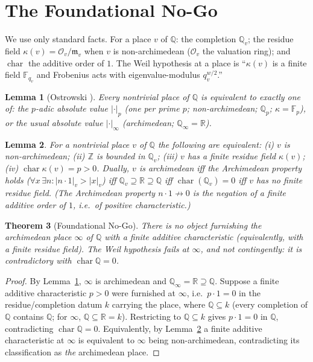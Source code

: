 \documentclass[11pt,reqno]{amsart}
\theoremstyle{plain}
\newtheorem{theorem}{Theorem}
\newtheorem{lemma}[theorem]{Lemma}
\theoremstyle{definition}
\theoremstyle{remark}
\newcommand{\Q}{\mathbb{Q}}
\newcommand{\R}{\mathbb{R}}
\newcommand{\Z}{\mathbb{Z}}
\newcommand{\F}{\mathbb{F}}
\newcommand{\m}{\mathfrak{m}}
\newcommand{\Oo}{\mathcal{O}}
\newcommand{\Char}{\operatorname{char}}
\begin{document}
\section{The Foundational No-Go}\label{sec:A}

We use only standard facts. For a place $v$ of $\Q$: the completion $\Q_v$; the residue field
$\kappa(v)=\Oo_v/\m_v$ when $v$ is non-archimedean ($\Oo_v$ the valuation ring); and $\Char$ the additive
order of $1$. The Weil hypothesis at a place is ``$\kappa(v)$ is a finite field $\F_{q_v}$ and Frobenius acts
with eigenvalue-modulus $q_v^{w/2}$.''

\begin{lemma}[Ostrowski {\cite{Ostrowski}}]\label{lem:ostrowski}
Every nontrivial place of $\Q$ is equivalent to exactly one of: the $p$-adic absolute value $|\cdot|_p$ (one
per prime $p$; non-archimedean; $\Q_p$; $\kappa=\F_p$), or the usual absolute value $|\cdot|_\infty$
(archimedean; $\Q_\infty=\R$).
\end{lemma}

\begin{lemma}\label{lem:equiv}
For a nontrivial place $v$ of $\Q$ the following are equivalent: \emph{(i)} $v$ is non-archimedean;
\emph{(ii)} $\Z$ is bounded in $\Q_v$; \emph{(iii)} $v$ has a finite residue field $\kappa(v)$;
\emph{(iv)} $\Char\kappa(v)=p>0$. Dually, $v$ is archimedean iff the Archimedean property holds
($\forall x\,\exists n: |n\cdot 1|_v>|x|_v$) iff $\Q_v\supseteq\R\supseteq\Q$ iff $\Char(\Q_v)=0$ iff $v$ has
no finite residue field. (The Archimedean property $n\cdot 1\not\to 0$ is the negation of a finite additive
order of $1$, i.e.\ of positive characteristic.)
\end{lemma}

\begin{theorem}[Foundational No-Go]\label{thm:A}
There is no object furnishing the archimedean place $\infty$ of $\Q$ with a finite additive characteristic
(equivalently, with a finite residue field). The Weil hypothesis fails at $\infty$, and not contingently: it
is contradictory with $\Char\Q=0$.
\end{theorem}

\begin{proof}
By Lemma~\ref{lem:ostrowski}, $\infty$ is archimedean and $\Q_\infty=\R\supseteq\Q$. Suppose a finite
additive characteristic $p>0$ were furnished at $\infty$, i.e.\ $p\cdot 1=0$ in the residue/completion datum
$k$ carrying the place, where $\Q\subseteq k$ (every completion of $\Q$ contains $\Q$; for $\infty$,
$\Q\subseteq\R=k$). Restricting to $\Q\subseteq k$ gives $p\cdot 1=0$ in $\Q$, contradicting $\Char\Q=0$.
Equivalently, by Lemma~\ref{lem:equiv} a finite additive characteristic at $\infty$ is equivalent to $\infty$
being non-archimedean, contradicting its classification as \emph{the} archimedean place.
\end{proof}
\end{document}
